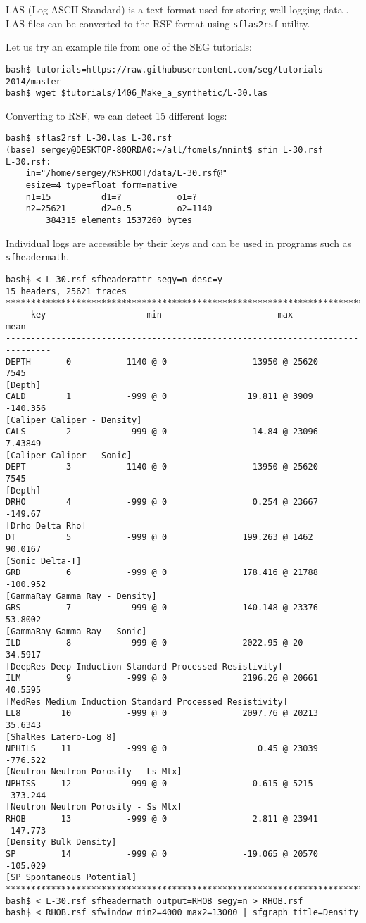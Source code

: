 LAS (Log ASCII Standard) is a text format used for storing
well-logging data \cite[]{las}. LAS files can be converted to the RSF format using
\texttt{sflas2rsf} utility.

Let us try an example file from one of the SEG tutorials:
\begin{verbatim}
bash$ tutorials=https://raw.githubusercontent.com/seg/tutorials-2014/master
bash$ wget $tutorials/1406_Make_a_synthetic/L-30.las
\end{verbatim}
Converting to RSF, we can detect 15 different logs:
\begin{verbatim}
bash$ sflas2rsf L-30.las L-30.rsf
(base) sergey@DESKTOP-80QRDA0:~/all/fomels/nnint$ sfin L-30.rsf
L-30.rsf:
    in="/home/sergey/RSFROOT/data/L-30.rsf@"
    esize=4 type=float form=native
    n1=15          d1=?           o1=?
    n2=25621       d2=0.5         o2=1140
        384315 elements 1537260 bytes
\end{verbatim}
Individual logs are accessible by their keys and can be used in programs such as \texttt{sfheadermath}.
\begin{verbatim}
bash$ < L-30.rsf sfheaderattr segy=n desc=y
15 headers, 25621 traces
*******************************************************************************
     key                    min                       max                 mean
-------------------------------------------------------------------------------
DEPTH       0           1140 @ 0                 13950 @ 25620            7545
[Depth]
CALD        1           -999 @ 0                19.811 @ 3909         -140.356
[Caliper Caliper - Density]
CALS        2           -999 @ 0                 14.84 @ 23096         7.43849
[Caliper Caliper - Sonic]
DEPT        3           1140 @ 0                 13950 @ 25620            7545
[Depth]
DRHO        4           -999 @ 0                 0.254 @ 23667         -149.67
[Drho Delta Rho]
DT          5           -999 @ 0               199.263 @ 1462          90.0167
[Sonic Delta-T]
GRD         6           -999 @ 0               178.416 @ 21788        -100.952
[GammaRay Gamma Ray - Density]
GRS         7           -999 @ 0               140.148 @ 23376         53.8002
[GammaRay Gamma Ray - Sonic]
ILD         8           -999 @ 0               2022.95 @ 20            34.5917
[DeepRes Deep Induction Standard Processed Resistivity]
ILM         9           -999 @ 0               2196.26 @ 20661         40.5595
[MedRes Medium Induction Standard Processed Resistivity]
LL8        10           -999 @ 0               2097.76 @ 20213         35.6343
[ShalRes Latero-Log 8]
NPHILS     11           -999 @ 0                  0.45 @ 23039        -776.522
[Neutron Neutron Porosity - Ls Mtx]
NPHISS     12           -999 @ 0                 0.615 @ 5215         -373.244
[Neutron Neutron Porosity - Ss Mtx]
RHOB       13           -999 @ 0                 2.811 @ 23941        -147.773
[Density Bulk Density]
SP         14           -999 @ 0               -19.065 @ 20570        -105.029
[SP Spontaneous Potential]
*******************************************************************************
bash$ < L-30.rsf sfheadermath output=RHOB segy=n > RHOB.rsf
bash$ < RHOB.rsf sfwindow min2=4000 max2=13000 | sfgraph title=Density
\end{verbatim}




